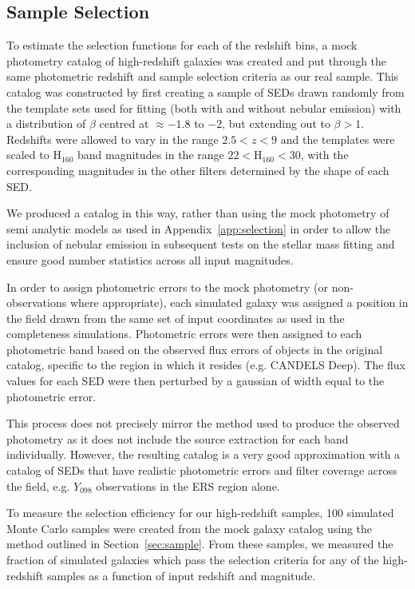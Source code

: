 \subsection{Sample Selection}\label{sec:selection_sims}
To estimate the selection functions for each of the redshift bins, a mock photometry catalog of high-redshift galaxies was created and put through the same photometric redshift and sample selection criteria as our real sample. This catalog was constructed by first creating a sample of SEDs drawn randomly from the template sets used for fitting (both with and without nebular emission) with a distribution of $\beta$ centred at $\approx -1.8$ to $-2$, but extending out to $\beta > 1$. Redshifts were allowed to vary in the range $2.5 < z < 9$ and the templates were scaled to $\text{H}_{160}$ band magnitudes in the range $22 < \text{H}_{160} < 30$, with the corresponding magnitudes in the other filters determined by the shape of each SED.

We produced a catalog in this way, rather than using the mock photometry of semi analytic models as used in Appendix~\ref{app:selection} in order to allow the inclusion of nebular emission in subsequent tests on the stellar mass fitting and ensure good number statistics across all input magnitudes. 

In order to assign photometric errors to the mock photometry (or non-observations where appropriate), each simulated galaxy was assigned a position in the field drawn from the same set of input coordinates as used in the completeness simulations. Photometric errors were then assigned to each photometric band based on the observed flux errors of objects in the original catalog, specific to the region in which it resides (e.g. CANDELS Deep). The flux values for each SED were then perturbed by a gaussian of width equal to the photometric error.

This process does not precisely mirror the method used to produce the observed photometry as it does not include the source extraction for each band individually. However, the resulting catalog is a very good approximation with a catalog of SEDs that have realistic photometric errors and filter coverage across the field, e.g. $Y_{098}$ observations in the ERS region alone. 

To measure the selection efficiency for our high-redshift samples, 100 simulated Monte Carlo samples were created from the mock galaxy catalog using the method outlined in Section~\ref{sec:sample}. From these samples, we measured the fraction of simulated galaxies which pass the selection criteria for any of the high-redshift samples as a function of input redshift and magnitude.

